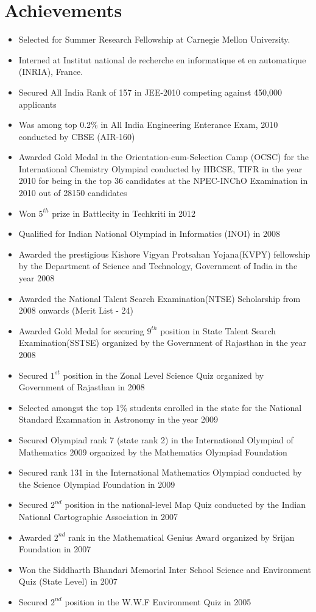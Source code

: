 \documentclass[margin,line]{resume}
\begin{document}
\begin{resume}
\begin{itemize}
  \end{itemize}

  \section{\mysidestyle Achievements}
  \begin{itemize}
  \item Selected for Summer Research Fellowship at Carnegie Mellon University.
  \item Interned at Institut national de recherche en informatique et en automatique (INRIA), France.
  \item Secured All India Rank of 157 in JEE-2010 competing against 450,000 applicants
  \item Was among top 0.2\% in All India Engineering Enterance Exam, 2010 conducted by CBSE (AIR-160)
  \item Awarded Gold Medal in the Orientation-cum-Selection Camp (OCSC) for the International Chemistry Olympiad conducted by HBCSE, TIFR in the year 2010 for being in the top 36 candidates at the NPEC-INChO Examination in 2010 out of 28150 candidates
  \item Won $5^{th}$ prize in Battlecity in Techkriti in 2012
  \item Qualified for Indian National Olympiad in Informatics (INOI) in 2008
  \item Awarded the prestigious Kishore Vigyan Protsahan Yojana(KVPY) fellowship by the Department of Science and Technology, Government of India in the year 2008
  \item Awarded the National Talent Search Examination(NTSE) Scholarship from 2008 onwards (Merit List - 24)
  \item Awarded Gold Medal for securing $9^{th}$ position in State Talent Search Examination(SSTSE) organized by the Government of Rajasthan in the year 2008
  \item Secured $1^{st}$ position in the Zonal Level Science Quiz organized by Government of Rajasthan in 2008
  \item Selected amongst the top 1\% students enrolled in the state for the National Standard Examnation in Astronomy in the year 2009
  \item Secured Olympiad rank 7 (state rank 2) in the International Olympiad of Mathematics 2009 organized by the Mathematics Olympiad Foundation
  \item Secured rank 131 in the International Mathematics Olympiad conducted by the Science Olympiad Foundation in 2009
  \item Secured $2^{nd}$ position in the national-level Map Quiz conducted by the Indian National Cartographic Association in 2007
  \item Awarded $2^{nd}$ rank in the Mathematical Genius Award organized by Srijan Foundation in 2007
  \item Won the Siddharth Bhandari Memorial Inter School Science and Environment Quiz (State Level) in 2007
  \item Secured $2^{nd}$ position in the W.W.F Environment Quiz in 2005
  \end{itemize}

\end{resume}
\end{document}
